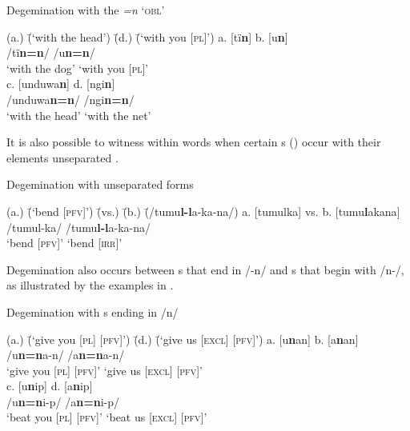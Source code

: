 \ea%
    \label{ex:phon:88}
          Degemination with the  \textit{=n} ‘\textsc{obl}’
\begin{tabbing}
{(a.)} \= {(‘with the head’)} \= {(d.)} \= {(‘with you [\textsc{pl}]’)}\kill
{a.} \> {[tï\textbf{n}]} \> {b.} \> {[u\textbf{n}]}\\
{ } \> {/tï\textbf{n=n}/} \> { } \> {/u\textbf{n=n}/}\\
{ } \> {‘with the dog’} \> { } \> {‘with you [\textsc{pl}]’}\\
{c.} \> {[unduwa\textbf{n}]} \> {d.} \> {[ngi\textbf{n}]}\\
{ } \> {/unduwa\textbf{n=n}/} \> { } \> {/ngi\textbf{n=n}/}\\
{ } \> {‘with the head’} \> { } \> {‘with the net’}
\end{tabbing}
\z

It is also possible to witness  within words when certain s () occur with their elements unseparated .

\ea%
    \label{ex:phon:89}
          Degemination with unseparated  forms\\
\begin{tabbing}
{(a.)} \= {(‘bend [\textsc{pfv}]’)} \= {(vs.)} \= {(b.)} \= {(/tumu\textbf{l-l}a-ka-na/)}\kill
{a.} \> {[tumulka]} \> {vs.} \> {b.} \> {[tumu\textbf{l}akana]}\\
{ } \> {/tumul-ka/} \> { } \> { } \> {/tumu\textbf{l-l}a-ka-na/}\\
{ } \> {‘bend [\textsc{pfv]}’} \> { } \> { } \> {‘bend [\textsc{irr]}’}
\end{tabbing}
\z

Degemination also occurs between  s that end in /-n/ and s that begin with /n-/, as illustrated by the examples in .

\ea%
    \label{ex:phon:90}
          Degemination with  s ending in /n/\\
\begin{tabbing}
{(a.)} \= {(‘give you [\textsc{pl}] [\textsc{pfv}]’)} \= {(d.)} \= {(‘give us [\textsc{excl}] [\textsc{pfv}]’)}\kill
{a.} \> {[u\textbf{n}an]} \> {b.} \> {[a\textbf{n}an]}\\
{ } \> {/u\textbf{n=n}a-n/} \> { } \> {/a\textbf{n=n}a-n/}\\
{ } \> {‘give you [\textsc{pl}] [\textsc{pfv}]’} \> { } \> {‘give us [\textsc{excl}] [\textsc{pfv}]’}\\
{c.} \> {[u\textbf{n}ip]} \> {d.} \> {[a\textbf{n}ip]}\\
{ } \> {/u\textbf{n=n}i-p/} \> { } \> {/a\textbf{n=n}i-p/}\\
{ } \> {‘beat you [\textsc{pl}] [\textsc{pfv}]’} \> { } \> {‘beat us [\textsc{excl}] [\textsc{pfv}]’}
\end{tabbing}
\z

